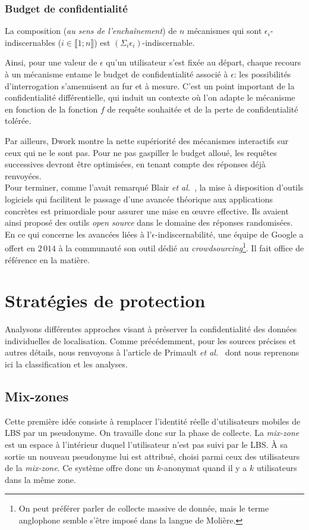 \documentclass[a4paper,11pt]{article} %
\begin{document}
\subsubsection{Budget de confidentialité}
%
La composition (\emph{au sens de l'enchaînement}) de $n$ mécanismes qui sont $\epsilon_i$-indiscernables ($i\in \llbracket1;n\rrbracket$) est $\left(\Sigma_i\epsilon_i\right)$-indiscernable.

Ainsi, pour une valeur de $\epsilon$ qu'un utilisateur s'est fixée au départ, chaque recours à un mécanisme entame le \og budget de confidentialité\fg{} associé à $\epsilon$: les possibilités d'interrogation s'amenuisent au fur et à mesure. C'est un point important de la confidentialité différentielle, qui induit un contexte où l'on adapte le mécanisme en fonction de la fonction $f$ de requête souhaitée et de la perte de confidentialité tolérée.

Par ailleurs, Dwork montre la nette supériorité des mécanismes interactifs sur ceux qui ne le sont pas. Pour ne pas gaspiller le budget alloué, les requêtes successives devront être optimisées, en tenant compte des réponses déjà renvoyées.\\[-0.4em]

Pour terminer, comme l'avait remarqué Blair \textit{et al.}~\cite{BIZ15}, la mise à disposition d'outils logiciels qui facilitent le passage d'une avancée théorique aux applications concrètes est primordiale pour assurer une mise en œuvre effective. Ils avaient ainsi proposé des outils \emph{open source} dans le domaine des réponses randomisées. En ce qui concerne les avancées liées à l'$\epsilon$-indiscernabilité, une équipe de Google a offert en $2\,014$ à la communauté son outil dédié au \emph{crowdsourcing}\footnote{On peut préférer parler de collecte massive de donnée, mais le terme anglophone semble s'être imposé dans la langue de Molière.}. Il fait office de référence en la matière.
\section{Stratégies de protection}
Analysons différentes approches visant à préserver la confidentialité des données individuelles de localisation. Comme précédemment, pour les sources précises et autres détails, nous renvoyons à l'article de Primault \textit{et al.}~\cite{PBMB19} dont nous reprenons ici la classification et les analyses.
%
\subsection{Mix-zones}
%
Cette première idée consiste à remplacer l'identité réelle d'utilisateurs mobiles de LBS par un pseudonyme. On travaille donc sur la phase de collecte. La \emph{mix-zone} est un espace à l'intérieur duquel l'utilisateur n'est pas \og suivi\fg{} par le LBS. 
À sa sortie un nouveau pseudonyme lui est attribué, choisi parmi ceux des utilisateurs de la \emph{mix-zone}. 
Ce système offre donc un $k$-anonymat quand il y a $k$ utilisateurs dans la même zone.
\end{document}
